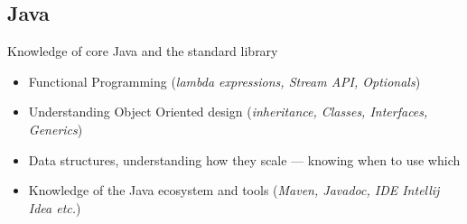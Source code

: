 \documentclass[a4paper, 13pt, draft]{article}
\newcommand{\proglang}[1]{\subsection*{#1}}
\begin{document}
\proglang{Java}

Knowledge of core Java and the standard library

\begin{itemize}
    \setlength\itemsep{0em}
\item
    Functional Programming (\textit{lambda expressions, Stream API, Optionals})
\item
    Understanding Object Oriented design (\textit{inheritance, Classes, Interfaces, Generics})
\item
    Data structures, understanding how they scale --- knowing when to use which
\item
    Knowledge of the Java ecosystem and tools (\textit{Maven, Javadoc, IDE Intellij Idea etc.})
\end{itemize}

\pagebreak
\end{document}
